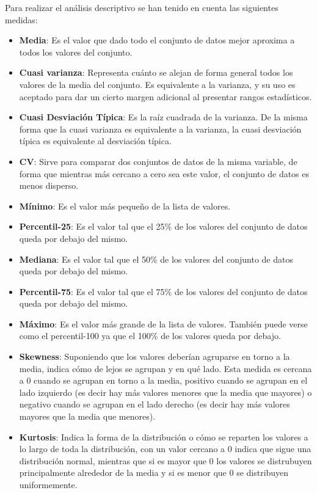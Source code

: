 \documentclass{article}
\begin{document}
Para realizar el análisis descriptivo se han tenido en cuenta las siguientes medidas:
\begin{itemize}
\item \textbf{Media}: Es el valor que dado todo el conjunto de datos mejor aproxima a todos los valores del conjunto.
\item \textbf{Cuasi varianza}: Representa cuánto se alejan de forma general todos los valores de la media del conjunto. Es equivalente a la varianza, y su uso es aceptado para dar un cierto margen adicional al presentar rangos estadísticos.
\item \textbf{Cuasi Desviación Típica}: Es la raíz cuadrada de la varianza. De la misma forma que la cuasi varianza es equivalente a la varianza, la cuasi desviación típica es equivalente al desviación típica.
\item \textbf{CV}: Sirve para comparar dos conjuntos de datos de la misma variable, de forma que mientras más cercano a cero sea este valor, el conjunto de datos es menos disperso. 
\item \textbf{Mínimo}: Es el valor más pequeño de la lista de valores.
\item \textbf{Percentil-25}: Es el valor tal que el 25\% de los valores del conjunto de datos queda por debajo del mismo.
\item \textbf{Mediana}: Es el valor tal que el 50\% de los valores del conjunto de datos queda por debajo del mismo.
\item \textbf{Percentil-75}: Es el valor tal que el 75\% de los valores del conjunto de datos queda por debajo del mismo.
\item \textbf{Máximo}: Es el valor más grande de la lista de valores. También puede verse como el percentil-100 ya que el 100\% de los valores queda por debajo.
\item \textbf{Skewness}: Suponiendo que los valores deberían agruparse en torno a la media, indica cómo de lejos se agrupan y en qué lado. Esta medida es cercana a 0 cuando se agrupan en torno a la media, positivo cuando se agrupan en el lado izquierdo (es decir hay más valores menores que la media que mayores) o negativo cuando se agrupan en el lado derecho (es decir hay más valores mayores que la media que menores). 
\item \textbf{Kurtosis}: Indica la forma de la distribución o cómo se reparten los valores a lo largo de toda la distribución, con un valor cercano a 0 indica que sigue una distribución normal, mientras que si es mayor que 0 los valores se distrubuyen principalmente alrededor de la media y si es menor que 0 se distribuyen uniformemente.
\end{itemize}
\end{document}
